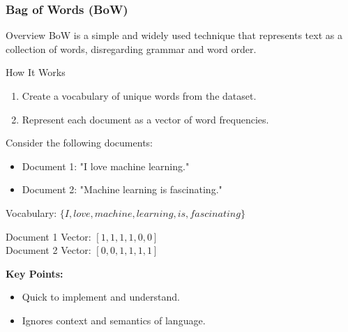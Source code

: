 \documentclass[aspectratio=169]{beamer}
\begin{document}
\begin{frame}[fragile]
    \frametitle{Bag of Words (BoW)}
    \begin{block}{Overview}
        BoW is a simple and widely used technique that represents text as a collection of words, disregarding grammar and word order.
    \end{block}
    
    \begin{block}{How It Works}
        \begin{enumerate}
            \item Create a vocabulary of unique words from the dataset.
            \item Represent each document as a vector of word frequencies.
        \end{enumerate}
    \end{block}
    
    \begin{example}
    Consider the following documents:
    \begin{itemize}
        \item Document 1: "I love machine learning."
        \item Document 2: "Machine learning is fascinating."
    \end{itemize}
    
    Vocabulary: $\{I, love, machine, learning, is, fascinating\}$
    
    Document 1 Vector: $[1, 1, 1, 1, 0, 0]$ \\
    Document 2 Vector: $[0, 0, 1, 1, 1, 1]$
    
    \textbf{Key Points:}
    \begin{itemize}
        \item Quick to implement and understand.
        \item Ignores context and semantics of language.
    \end{itemize}
    \end{example}
\end{frame}
\end{document}
